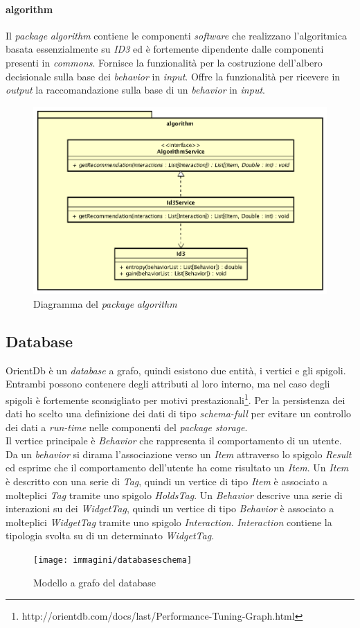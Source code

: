 \paragraph*{algorithm}
Il \emph{package} \emph{algorithm} contiene le componenti \emph{software} che realizzano l'algoritmica basata essenzialmente su \emph{ID3} ed è fortemente dipendente dalle componenti presenti in \emph{commons}. Fornisce la funzionalità per la costruzione dell'albero decisionale sulla base dei \emph{behavior} in \emph{input}. Offre la funzionalità per ricevere in \emph{output} la raccomandazione sulla base di un \emph{behavior} in \emph{input}.
\begin{figure}[h]
\centering
\includegraphics[scale=0.30]{immagini/algorithm}
\caption{Diagramma del \emph{package} \emph{algorithm}}
\label{fig:pack-algorithm}
\end{figure}
\subsection{Database}
OrientDb è un \emph{database} a grafo, quindi esistono due entità, i vertici e gli spigoli. Entrambi possono contenere degli attributi al loro interno, ma nel caso degli spigoli è fortemente sconsigliato per motivi prestazionali\footnote{http://orientdb.com/docs/last/Performance-Tuning-Graph.html}. Per la persistenza dei dati ho scelto una definizione dei dati di tipo \emph{schema-full} per evitare un controllo dei dati a \emph{run-time} nelle componenti del \emph{package} \emph{storage}.\\
Il vertice principale è \emph{Behavior} che rappresenta il comportamento di un utente. Da un \emph{behavior} si dirama l'associazione verso un \emph{Item} attraverso lo spigolo \emph{Result} ed esprime che il comportamento dell'utente ha come risultato un \emph{Item}. Un \emph{Item} è descritto con una serie di \emph{Tag}, quindi un vertice di tipo \emph{Item} è associato a molteplici \emph{Tag} tramite uno spigolo \emph{HoldsTag}. Un \emph{Behavior} descrive una serie di interazioni su dei \emph{WidgetTag}, quindi un vertice di tipo \emph{Behavior} è associato a molteplici \emph{WidgetTag} tramite uno spigolo \emph{Interaction}. \emph{Interaction} contiene la tipologia svolta su di un determinato \emph{WidgetTag}.
\begin{figure}[h]
\centering
\texttt{[image: immagini/databaseschema]}
\caption{Modello a grafo del database}
\label{fig:database-schema}
\end{figure}
